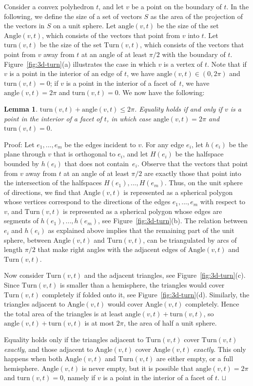 \documentclass[11pt,a4paper]{article}
\newcommand{\angl}{\mathrm{angle}}
\newcommand{\turn}{\mathrm{turn}}
\newcommand{\Angl}{\mathrm{Angle}}
\newcommand{\Turn}{\mathrm{Turn}}
\newtheorem{lemma}{Lemma}
\newenvironment{proof}{Proof:}{\qed}
\def\squareforqed{\hbox{\rlap{$\sqcap$}$\sqcup$}}
\def\qed{\ifmmode\squareforqed\else{\unskip\nobreak\hfil
\penalty50\hskip1em\null\nobreak\hfil\squareforqed
\parfillskip=0pt\finalhyphendemerits=0\endgraf}\fi}
\begin{document}
Consider a convex polyhedron $t$, and let $v$ be a point on the boundary of $t$. In the following, we define the size of a set of vectors $S$ as the area of the projection of the vectors in $S$ on a unit sphere. Let $\angl(v,t)$ be the size of the set $\Angl(v,t)$, which consists of the vectors that point from $v$ into $t$. Let $\turn(v,t)$ be the size of the set $\Turn(v,t)$, which consists of the vectors that point from $v$ away from $t$ at an angle of at least $\pi/2$ with the boundary of $t$. Figure~\ref{fig:3d-turn}(a) illustrates the case in which $v$ is a vertex of $t$. Note that if $v$ is a point in the interior of an edge of $t$, we have $\angl(v,t) \in (0,2\pi)$ and $\turn(v,t) = 0$; if $v$ is a point in the interior of a facet of~$t$, we have $\angl(v,t) = 2\pi$ and $\turn(v,t) = 0$. We now have the following:
\begin{lemma}\label{le:angleplusturn}
$\turn(v,t) + \angl(v,t) \leq 2\pi$. Equality holds if and only if $v$ is a point in the interior of a facet of $t$, in which case $\angl(v,t) = 2\pi$ and $\turn(v,t) = 0$.
\end{lemma}
\begin{proof}
Let $e_1,...,e_m$ be the edges incident to $v$. For any edge $e_i$, let $h(e_i)$ be the plane through $v$ that is orthogonal to $e_i$, and let $H(e_i)$ be the halfspace bounded by $h(e_i)$ that does not contain~$e_i$. Observe that the vectors that point from $v$ away from $t$ at an angle of at least $\pi/2$ are exactly those that point into the intersection of the halfspaces $H(e_1),...,H(e_m)$. Thus, on the unit sphere of directions, we find that $\Angl(v,t)$ is represented as a spherical polygon whose vertices correspond to the directions of the edges $e_1,...,e_m$ with respect to $v$, and $\Turn(v,t)$ is represented as a spherical polygon whose edges are segments of $h(e_1),...,h(e_m)$, see Figure~\ref{fig:3d-turn}(b). The relation between $e_i$ and $h(e_i)$ as explained above implies that the remaining part of the unit sphere, between $\Angl(v,t)$ and $\Turn(v,t)$, can be triangulated by arcs of length $\pi/2$ that make right angles with the adjacent edges of $\Angl(v,t)$ and $\Turn(v,t)$.

Now consider $\Turn(v,t)$ and the adjacent triangles, see Figure~\ref{fig:3d-turn}(c). Since $\Turn(v,t)$ is smaller than a hemisphere, the triangles would cover $\Turn(v,t)$ completely if folded onto it, see Figure~\ref{fig:3d-turn}(d). Similarly, the triangles adjacent to $\Angl(v,t)$ would cover $\Angl(v,t)$ completely. Hence the total area of the triangles is at least $\angl(v,t) + \turn(v,t)$, so $\angl(v,t) + \turn(v,t)$ is at most $2\pi$, the area of half a unit sphere.

Equality holds only if the triangles adjacent to $\Turn(v,t)$ cover $\Turn(v,t)$ \emph{exactly}, and those adjacent to $\Angl(v,t)$ cover $\Angl(v,t)$ \emph{exactly}. This only happens when both $\Angl(v,t)$ and $\Turn(v,t)$ are either empty, or a full hemisphere. $\Angl(v,t)$ is never empty, but it is possible that $\angl(v,t) = 2\pi$ and $\turn(v,t) = 0$, namely if $v$ is a point in the interior of a facet of $t$.
\end{proof}
\end{document}
